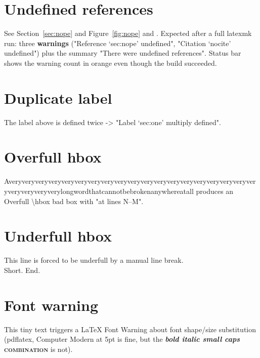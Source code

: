 \documentclass{article}
\begin{document}
\section{Undefined references}\label{sec:one}
See Section~\ref{sec:nope} and Figure~\ref{fig:nope} and \cite{nocite}.
Expected after a full latexmk run: three \textbf{warnings}
("Reference `sec:nope' undefined", "Citation `nocite' undefined") plus the
summary "There were undefined references". Status bar shows the warning count
in orange even though the build succeeded.

\section{Duplicate label}\label{sec:one}
The label above is defined twice -> "Label `sec:one' multiply defined".

\section{Overfull hbox}
\noindent Averyveryveryveryveryveryveryveryveryveryveryveryveryveryveryveryveryveryveryveryveryveryverylongwordthatcannotbebrokenanywhereatall
produces an Overfull \textbackslash hbox bad box with "at lines N--M".

\section{Underfull hbox}
\noindent This line is forced to be underfull by a manual line break.\\
Short.\linebreak
End.

\section{Font warning}
\fontsize{5}{6}\selectfont This tiny text triggers a LaTeX Font Warning about
font shape/size substitution (pdflatex, Computer Modern at 5pt is fine, but the
\textbf{\textit{bold italic small caps}} \textsc{\textbf{combination}} is not).
\normalsize
\end{document}
